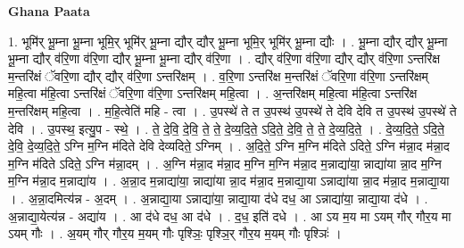 \documentclass[17pt]{extarticle}
\begin{document}
\textbf{Ghana Paata } \newline

1. भूमि॑र् भू॒म्ना भू॒म्ना भूमि॒र् भूमि॑र् भू॒म्ना द्यौर् द्यौर् भू॒म्ना भूमि॒र् भूमि॑र् भू॒म्ना द्यौः । . भू॒म्ना द्यौर् द्यौर् भू॒म्ना भू॒म्ना द्यौर् व॑रि॒णा व॑रि॒णा द्यौर् भू॒म्ना भू॒म्ना द्यौर् व॑रि॒णा । . द्यौर् व॑रि॒णा व॑रि॒णा द्यौर् द्यौर् व॑रि॒णा ऽन्तरि॑क्ष म॒न्तरि॑क्षं ॅवरि॒णा द्यौर् द्यौर् व॑रि॒णा ऽन्तरि॑क्षम् । . व॒रि॒णा ऽन्तरि॑क्ष म॒न्तरि॑क्षं ॅवरि॒णा व॑रि॒णा ऽन्तरि॑क्षम् महि॒त्वा म॑हि॒त्वा ऽन्तरि॑क्षं ॅवरि॒णा व॑रि॒णा ऽन्तरि॑क्षम् महि॒त्वा । . अ॒न्तरि॑क्षम् महि॒त्वा म॑हि॒त्वा ऽन्तरि॑क्ष म॒न्तरि॑क्षम् महि॒त्वा । . म॒हि॒त्वेति॑ महि - त्वा । . उ॒पस्थे॑ ते त उ॒पस्थ॑ उ॒पस्थे॑ ते देवि देवि त उ॒पस्थ॑ उ॒पस्थे॑ ते देवि । . उ॒पस्थ॒ इत्यु॒प - स्थे॒ । . ते॒ दे॒वि॒ दे॒वि॒ ते॒ ते॒ दे॒व्य॒दि॒ते॒ ऽदि॒ते॒ दे॒वि॒ ते॒ ते॒ दे॒व्य॒दि॒ते॒ । . दे॒व्य॒दि॒ते॒ ऽदि॒ते॒ दे॒वि॒ दे॒व्य॒दि॒ते॒ ऽग्नि म॒ग्नि म॑दिते देवि देव्यदिते॒ ऽग्निम् । . अ॒दि॒ते॒ ऽग्नि म॒ग्नि म॑दिते ऽदिते॒ ऽग्नि म॑न्ना॒द म॑न्ना॒द म॒ग्नि म॑दिते ऽदिते॒ ऽग्नि म॑न्ना॒दम् । . अ॒ग्नि म॑न्ना॒द म॑न्ना॒द म॒ग्नि म॒ग्नि म॑न्ना॒द म॒न्नाद्या॑या॒ न्नाद्या॑या न्ना॒द म॒ग्नि म॒ग्नि म॑न्ना॒द म॒न्नाद्या॑य । . अ॒न्ना॒द म॒न्नाद्या॑या॒ न्नाद्या॑या न्ना॒द म॑न्ना॒द म॒न्नाद्या॒या ऽन्नाद्या॑या न्ना॒द म॑न्ना॒द म॒न्नाद्या॒॒या । . अ॒न्ना॒दमित्य॑न्न - अ॒दम् । . अ॒न्नाद्या॒या ऽन्नाद्या॑या॒ न्नाद्या॒या द॑धे दध॒ आ ऽन्नाद्या॑या॒ न्नाद्या॒या द॑धे । . अ॒न्नाद्या॒येत्य॑न्न - अद्या॑य । . आ द॑धे दध॒ आ द॑धे । . द॒ध॒ इति॑ दधे । . आ ऽय म॒य मा ऽयम् गौर् गौर॒य मा ऽयम् गौः । . अ॒यम् गौर् गौर॒य म॒यम् गौः पृश्ञिः॒ पृश्ञि॒र् गौर॒य म॒यम् गौः पृश्ञिः॑ । \newline
\end{document}

